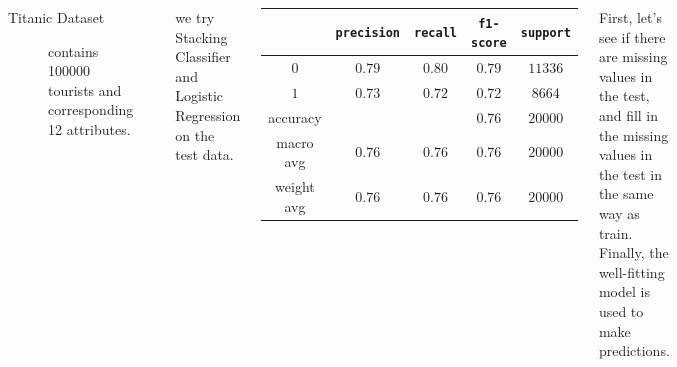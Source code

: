 \documentclass{tikzposter} %
\begin{document}
\begin{columns}
{
\begin{description}
  	\item[Titanic Dataset] contains 100000 tourists and corresponding 12 attributes.
\end{description}
\vspace{.5cm}
\begin{center}
\end{center}
\vspace{.5cm}
\begin{description}
    \item
    we try Stacking Classifier and Logistic Regression on the test data.
\end{description}
\vspace{.5cm}
\begin{center}
	\begin{tabular}{c| c c c c}
		\toprule
		{}  & \texttt{precision} & \texttt{recall}  & \texttt{f1-score} & \texttt{support} \\
		\midrule
		$0$
		&  {$0.79$} &  {$0.80$} &  {$0.79$} &  {$11336$} \\
		$1$
		&  {$0.73$} &  {$0.72$} &  {$0.72$} &  {$8664$} \\
		accuracy
		&  {} &  {} &  {$0.76$} &  {$20000$} \\
		macro avg
		&  {$0.76$} &  {$0.76$} &  {$0.76$} &  {$20000$} \\
		weight avg
		&  {$0.76$} &  {$0.76$} &  {$0.76$} &  {$20000$} \\
		\bottomrule
	\end{tabular}
\end{center}
\vspace{.5cm}
\begin{description}
	\item
	First, let’s see if there are missing values in the test, and fill in the missing values
	in the test in the same way as train. Finally, the well-fitting model is used to make
	predictions.
\end{description}

}
\end{columns}
\end{document}
